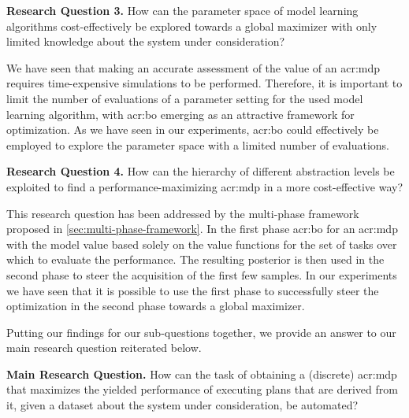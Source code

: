 \vspace{16pt}
\noindent%
\textbf{Research Question 3.} How can the parameter space of model learning algorithms cost-effectively be explored towards a global maximizer with only limited knowledge about the system under consideration?
\vspace{12pt}

We have seen that making an accurate assessment of the value of an \acrshort{acr:mdp} requires time-expensive simulations to be performed.
Therefore, it is important to limit the number of evaluations of a parameter setting for the used model learning algorithm, with \acrshort{acr:bo} emerging as an attractive framework for optimization.
As we have seen in our experiments, \acrshort{acr:bo} could effectively be employed to explore the parameter space with a limited number of evaluations.

\newpage

\vspace{16pt}
\noindent%
\textbf{Research Question 4.} How can the hierarchy of different abstraction levels be exploited to find a performance-maximizing \acrshort{acr:mdp} in a more cost-effective way?
\vspace{12pt}

This research question has been addressed by the multi-phase framework proposed in \autoref{sec:multi-phase-framework}.
In the first phase \acrshort{acr:bo} for an \acrshort{acr:mdp} with the model value based solely on the value functions for the set of tasks over which to evaluate the performance.
The resulting posterior is then used in the second phase to steer the acquisition of the first few samples.
In our experiments we have seen that it is possible to use the first phase to successfully steer the optimization in the second phase towards a global maximizer.
\vspace{12pt}

Putting our findings for our sub-questions together, we provide an answer to our main research question reiterated below.

\vspace{12pt}
\noindent%
\textbf{Main Research Question.} How can the task of obtaining a (discrete) \acrshort{acr:mdp} that maximizes the yielded performance of executing plans that are derived from it, given a dataset about the system under consideration, be automated?
\vspace{12pt}

